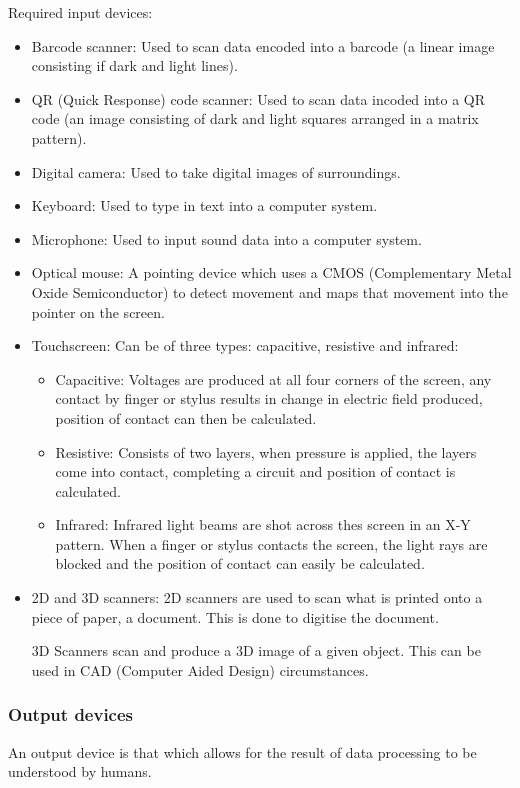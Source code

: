 \documentclass{article}
\begin{document}
Required input devices:
\begin{itemize}
	\item Barcode scanner: Used to scan data encoded into a barcode (a linear image 
		consisting if dark and light lines).
	\item QR (Quick Response) code scanner: Used to scan data incoded into a QR code (an
		image consisting of dark and light squares arranged in a matrix pattern).
	\item Digital camera: Used to take digital images of surroundings.
	\item Keyboard: Used to type in text into a computer system.
	\item Microphone: Used to input sound data into a computer system.
	\item Optical mouse: A pointing device which uses a CMOS (Complementary Metal Oxide
		Semiconductor) to detect movement and maps that movement into the pointer on
		the screen.
	\item Touchscreen: Can be of three types: capacitive, resistive and infrared:
		\begin{itemize}
			\item Capacitive: Voltages are produced at all four corners of the screen,
				any contact by finger or stylus results in change in electric field 
				produced, position of contact can then be calculated.
			\item Resistive: Consists of two layers, when pressure is applied, the layers
				come into contact, completing a circuit and position of contact is
				calculated.
			\item Infrared: Infrared light beams are shot across thes screen in an X-Y
				pattern. When a finger or stylus contacts the screen, the light rays are
				blocked and the position of contact can easily be calculated.
		\end{itemize}

	\item 2D and 3D scanners: 2D scanners are used to scan what is printed onto a piece
		of paper, a document. This is done to digitise the document.

		3D Scanners scan and produce a 3D image of a given object. This can be used in
		CAD (Computer Aided Design) circumstances.
\end{itemize}

\subsubsection{Output devices}
An output device is that which allows for the result of data processing to be understood
by humans.
\end{document}
